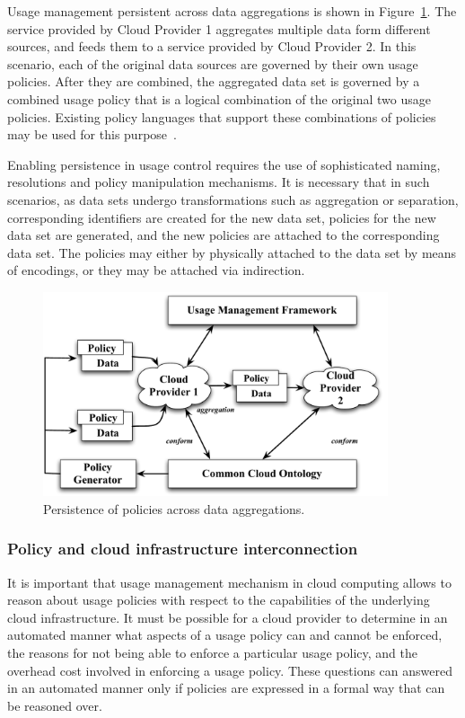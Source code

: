 \documentclass[notitlepage]{book}
\begin{document}
\begin{doublespace}
Usage management persistent across data aggregations is shown in Figure~\ref{fig:dynamics}. The service provided by Cloud Provider 1 aggregates multiple data form different sources, and feeds them to a service provided by Cloud Provider 2. In this scenario, each of the original data sources are governed by their own usage policies. After they are combined, the aggregated data set is governed by a combined usage policy that is a logical combination of the original two usage policies. Existing policy languages that support these combinations of policies may be used for this purpose~\cite{JaHe:08a}.

Enabling persistence in usage control requires the use of sophisticated naming, resolutions and policy manipulation mechanisms. It is necessary that in such scenarios, as data sets undergo transformations such as aggregation or separation, corresponding identifiers are created for the new data set, policies for the new data set are generated, and the new policies are attached to the corresponding data set. The policies may either by physically attached to the data set by means of encodings, or they may be attached via indirection. 

\begin{figure}[!t]
\centering
\includegraphics[width=4in]{dynamics}
\caption{Persistence of policies across data aggregations.}
\label{fig:dynamics}
\end{figure}

\subsubsection{Policy and cloud infrastructure interconnection}
It is important that usage management mechanism in cloud computing allows to reason about usage policies with respect to the capabilities of the underlying cloud infrastructure. It must be possible for a cloud provider to determine in an automated manner what aspects of a usage policy can and cannot be enforced, the reasons for not being able to enforce a particular usage policy, and the overhead cost involved in enforcing a usage policy. These questions can answered in an automated manner only if policies are expressed in a formal way that can be reasoned over. 


\end{doublespace}
\end{document}
